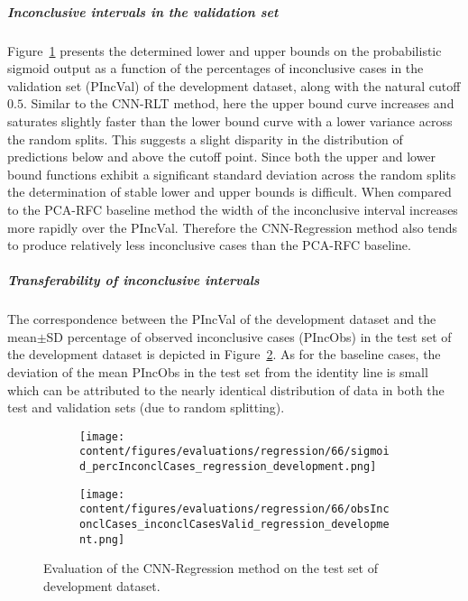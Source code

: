 \subparagraph{Inconclusive intervals in the validation set}

Figure~\ref{fig:regression_percInconclCases_development} presents the determined lower and upper bounds on the 
probabilistic sigmoid output as a function of the percentages of inconclusive cases 
in the validation set (PIncVal) of the development dataset, along with the natural cutoff $0.5$.
Similar to the CNN-RLT method, 
here the upper bound curve increases and saturates slightly faster than the lower bound curve with a lower variance across 
the random splits.
This suggests a slight disparity in the distribution of predictions below and above the cutoff point.
Since both the upper and lower bound functions exhibit a significant standard deviation across the random splits 
the determination of stable lower and upper bounds is difficult.
When compared to the PCA-RFC baseline method 
the width of the inconclusive interval increases more rapidly over the PIncVal.
Therefore the CNN-Regression method also tends to produce relatively less inconclusive cases than the PCA-RFC baseline.


\subparagraph{Transferability of inconclusive intervals}

The correspondence between the PIncVal of the development dataset 
and the mean$\pm$SD percentage of observed inconclusive cases (PIncObs) in the test set of the development dataset 
is depicted in Figure~\ref{fig:obsInconclCases_inconclCasesValid_regression_development}.
As for the baseline cases, the deviation of the mean PIncObs in the test set from the 
identity line is small which can be attributed to the nearly identical distribution of data in both the test and validation sets 
(due to random splitting).


\begin{figure}[ht]
  \begin{subfigure}{0.48\textwidth}
    \centering
    \texttt{[image: content/figures/evaluations/regression/66/sigmoid\_percInconclCases\_regression\_development.png]}
    \label{fig:regression_percInconclCases_development}
  \end{subfigure}
  \hfill
  \begin{subfigure}{0.495\textwidth}
    \centering
    \texttt{[image: content/figures/evaluations/regression/66/obsInconclCases\_inconclCasesValid\_regression\_development.png]}
    \label{fig:obsInconclCases_inconclCasesValid_regression_development}
  \end{subfigure}

  \caption{Evaluation of the CNN-Regression method on the test set of development dataset.}
  \label{fig:eval_cnn_regression_dev}
\end{figure}


